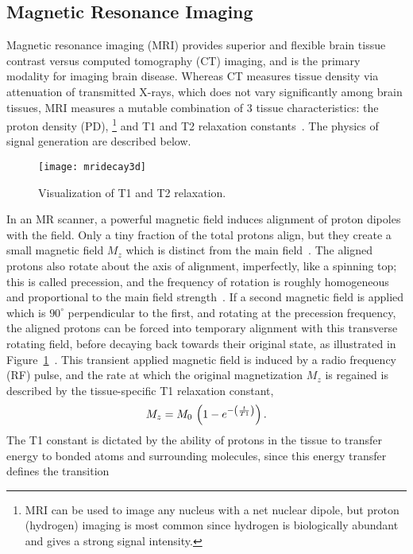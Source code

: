 \subsection{Magnetic Resonance Imaging}\label{ss:mri}
Magnetic resonance imaging (MRI) provides superior and flexible brain tissue contrast
versus computed tomography (CT) imaging, and is the primary modality for imaging brain disease.
Whereas CT measures tissue density via attenuation of transmitted X-rays,
which does not vary significantly among brain tissues,
MRI measures a mutable combination of 3 tissue characteristics: the proton density (PD),%
\footnote{MRI can be used to image any nucleus with a net nuclear dipole,
  but proton (hydrogen) imaging is most common since hydrogen is biologically abundant
  and gives a strong signal intensity.}
and T1 and T2 relaxation constants~\cite{Pooley2005}.
The physics of signal generation are described below.
\par
\begin{figure}[b]
  \centering\texttt{[image: mridecay3d]}
  \caption{Visualization of T1 and T2 relaxation.}%
  \label{fig:mridecay3d}
\end{figure}
In an MR scanner, a powerful magnetic field induces alignment of proton dipoles with the field.
Only a tiny fraction of the total protons align,
but they create a small magnetic field $M_z$ which is distinct from the main field~\cite{Bloch1946}.
The aligned protons also rotate about the axis of alignment, imperfectly, like a spinning top;
this is called precession, and the frequency of rotation is roughly homogeneous and proportional
to the main field strength~\cite{Bloch1946}.
If a second magnetic field is applied which is $90^{\circ}$ perpendicular to the first,
and rotating at the precession frequency, the aligned protons can be forced into
temporary alignment with this transverse rotating field, before decaying
back towards their original state, as illustrated in Figure~\ref{fig:mridecay3d}~\cite{Bloch1946}.
This transient applied magnetic field is induced by a radio frequency (RF) pulse,
and the rate at which the original magnetization $M_z$ is regained is described by
the tissue-specific T1 relaxation constant,
\begin{equation}
  M_z = M_0\et\left(1-e^{-\left(\frac{t}{T1}\right)}\right).%
  \label{eq:T1}
\end{equation}
The T1 constant is dictated by the ability of protons in the tissue to transfer energy
to bonded atoms and surrounding molecules, since this energy transfer defines the transition
